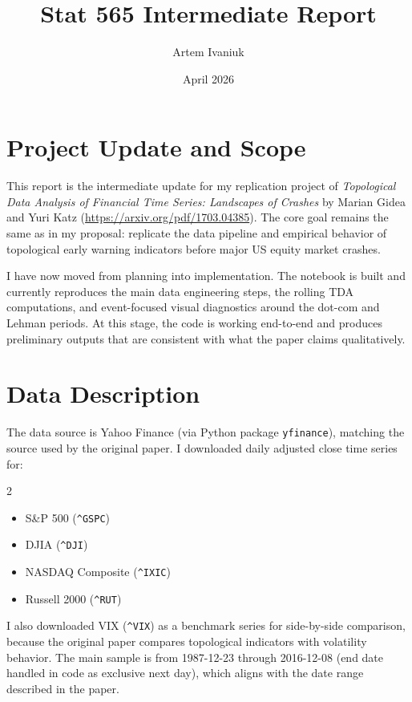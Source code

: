 \documentclass{article}
\title{Stat 565 Intermediate Report}
\author{Artem Ivaniuk}
\date{April 2026}
\begin{document}
\maketitle

\section*{Project Update and Scope}
This report is the intermediate update for my replication project of \textit{Topological Data Analysis of Financial Time Series: Landscapes of Crashes} by Marian Gidea and Yuri Katz (\url{https://arxiv.org/pdf/1703.04385}). The core goal remains the same as in my proposal: replicate the data pipeline and empirical behavior of topological early warning indicators before major US equity market crashes.

I have now moved from planning into implementation. The notebook is built and currently reproduces the main data engineering steps, the rolling TDA computations, and event-focused visual diagnostics around the dot-com and Lehman periods. At this stage, the code is working end-to-end and produces preliminary outputs that are consistent with what the paper claims qualitatively.

\section*{Data Description}
The data source is Yahoo Finance (via Python package \texttt{yfinance}), matching the source used by the original paper. I downloaded daily adjusted close time series for:
\begin{multicols}{2}
\begin{itemize}
    \item S\&P 500 (\texttt{\^{}GSPC})
    \item DJIA (\texttt{\^{}DJI})
    \item NASDAQ Composite (\texttt{\^{}IXIC})
    \item Russell 2000 (\texttt{\^{}RUT})
\end{itemize}
\end{multicols}

I also downloaded VIX (\texttt{\^{}VIX}) as a benchmark series for side-by-side comparison, because the original paper compares topological indicators with volatility behavior. The main sample is from 1987-12-23 through 2016-12-08 (end date handled in code as exclusive next day), which aligns with the date range described in the paper.
\end{document}
